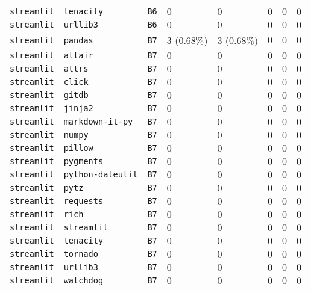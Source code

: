 \begin{table}
\begin{tabular}{llllllll}
\texttt{streamlit} & \texttt{tenacity} & \texttt{B6} & $0$ & $0$ & $0$ & $0$ & $0$ \\
\texttt{streamlit} & \texttt{urllib3} & \texttt{B6} & $0$ & $0$ & $0$ & $0$ & $0$ \\
\texttt{streamlit} & \texttt{pandas} & \texttt{B7} & $3$ ($0.68\%$) & $3$ ($0.68\%$) & $0$ & $0$ & $0$ \\
\texttt{streamlit} & \texttt{altair} & \texttt{B7} & $0$ & $0$ & $0$ & $0$ & $0$ \\
\texttt{streamlit} & \texttt{attrs} & \texttt{B7} & $0$ & $0$ & $0$ & $0$ & $0$ \\
\texttt{streamlit} & \texttt{click} & \texttt{B7} & $0$ & $0$ & $0$ & $0$ & $0$ \\
\texttt{streamlit} & \texttt{gitdb} & \texttt{B7} & $0$ & $0$ & $0$ & $0$ & $0$ \\
\texttt{streamlit} & \texttt{jinja2} & \texttt{B7} & $0$ & $0$ & $0$ & $0$ & $0$ \\
\texttt{streamlit} & \texttt{markdown-it-py} & \texttt{B7} & $0$ & $0$ & $0$ & $0$ & $0$ \\
\texttt{streamlit} & \texttt{numpy} & \texttt{B7} & $0$ & $0$ & $0$ & $0$ & $0$ \\
\texttt{streamlit} & \texttt{pillow} & \texttt{B7} & $0$ & $0$ & $0$ & $0$ & $0$ \\
\texttt{streamlit} & \texttt{pygments} & \texttt{B7} & $0$ & $0$ & $0$ & $0$ & $0$ \\
\texttt{streamlit} & \texttt{python-dateutil} & \texttt{B7} & $0$ & $0$ & $0$ & $0$ & $0$ \\
\texttt{streamlit} & \texttt{pytz} & \texttt{B7} & $0$ & $0$ & $0$ & $0$ & $0$ \\
\texttt{streamlit} & \texttt{requests} & \texttt{B7} & $0$ & $0$ & $0$ & $0$ & $0$ \\
\texttt{streamlit} & \texttt{rich} & \texttt{B7} & $0$ & $0$ & $0$ & $0$ & $0$ \\
\texttt{streamlit} & \texttt{streamlit} & \texttt{B7} & $0$ & $0$ & $0$ & $0$ & $0$ \\
\texttt{streamlit} & \texttt{tenacity} & \texttt{B7} & $0$ & $0$ & $0$ & $0$ & $0$ \\
\texttt{streamlit} & \texttt{tornado} & \texttt{B7} & $0$ & $0$ & $0$ & $0$ & $0$ \\
\texttt{streamlit} & \texttt{urllib3} & \texttt{B7} & $0$ & $0$ & $0$ & $0$ & $0$ \\
\texttt{streamlit} & \texttt{watchdog} & \texttt{B7} & $0$ & $0$ & $0$ & $0$ & $0$ \\

\end{tabular}
\end{table}
